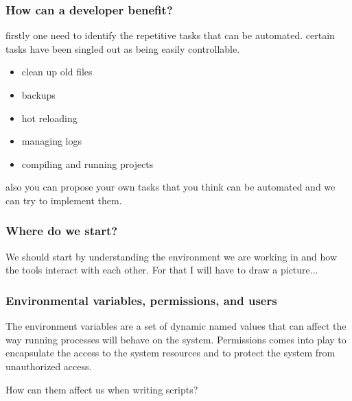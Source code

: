 \documentclass{beamer}
\begin{document}
\begin{frame}
\frametitle{How can a developer benefit?}
\small
firstly one need to identify the repetitive tasks that can be automated.\newline
certain tasks have been singled out as being easily controllable.
    \begin{itemize}
        \item clean up old files
        \item backups
        \item hot reloading
        \item managing logs
        \item compiling and running projects
    \end{itemize}
    also you can propose your own tasks that you think can be automated and
    we can try to implement them.

\end{frame}


\begin{frame}
    \frametitle {Where do we start?}
    \small
    We should start by understanding the environment we are working in and how
    the tools interact with each other. \newline \newline
    For that I will have to draw a picture...
\end{frame}


\begin{frame}
\frametitle{Environmental variables, permissions, and users}
\small
The environment variables are a set of dynamic named values that can affect the
    way running processes will behave on the system. \newline
    \newline
Permissions comes into play to encapsulate the access to the system resources
    and to protect the system from unauthorized access. \newline

How can them affect us when writing scripts?
\end{frame}
\end{document}
